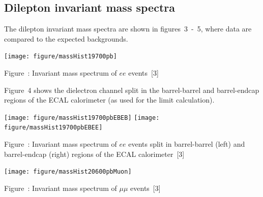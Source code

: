 \documentclass[a0b,portrait,preview]{a0poster}
\begin{document}
\begin{multicols}{3}
{\red \section*{\bf Dilepton invariant mass spectra}}
The dilepton invariant mass spectra are shown in {\darkgreen figures~3~-~5}, where data are compared to the expected backgrounds.

\begin{minipage}{\figwidth}
\vspace{1.0cm}
\unitlength=1cm
\begin{center}
{\texttt{[image: figure/massHist19700pb]}}%
\newline
\addtocounter{figscount}{1} 
{\small \captcolor Figure~: Invariant mass spectrum of $ee$ events~[3]} %
\end{center}
\label{fig:limit}
\vspace{1.5cm}
\end{minipage}

{\darkgreen Figure~4} shows the dielectron channel split in the barrel-barrel and barrel-endcap regions of the ECAL calorimeter (as used for the limit calculation).

\begin{minipage}{\figwidth}
\vspace{1.0cm}
\unitlength=1cm
\begin{center}
{\texttt{[image: figure/massHist19700pbEBEB]}}
{\texttt{[image: figure/massHist19700pbEBEE]}}
\newline
\addtocounter{figscount}{1} 
{\small \captcolor Figure~: Invariant mass spectrum of $ee$ events split in barrel-barrel (left) and barrel-endcap (right) regions of the ECAL calorimeter~[3]}%
\end{center}
\label{mass}
\end{minipage}

\begin{minipage}{\figwidth}
\unitlength=1cm
\begin{center}
{\texttt{[image: figure/massHist20600pbMuon]}}%
\newline
\addtocounter{figscount}{1} 
{\small \captcolor Figure~: Invariant mass spectrum of $\mu\mu$ events~[3] }
\end{center}
\label{fig:limit}
\vspace{1.5cm}
\end{minipage}


\end{multicols}
\end{document}
